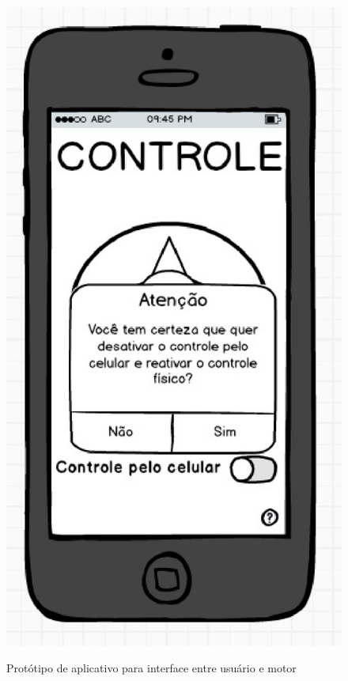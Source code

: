 \begin{figure}[!htb]
{  		\includegraphics[keepaspectratio=true,scale=0.6]{figuras/controle/tela_4}
		}
		\caption{Protótipo de aplicativo para interface entre usuário e motor}
		\label{fig:prototipos}
  \end{figure}
